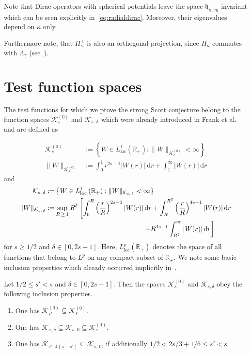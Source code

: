 \documentclass[AHL,Unicode,longabstracts,published]{cedram}
\newcommand{\loc}{\mathrm{loc}}
\newcommand*\dr{\mathrm{d}r}
\newcommand*\rz{\mathbb{R}}
\newcommand*\cK{\mathcal{K}}
\newcommand*\gh{\mathfrak{h}}
\begin{document}
Note that Dirac operators with spherical potentials leave the space $\gh_{\kappa,\,m}$ invariant which can be seen explicitly in~\eqref{eq:radialdirac}. Moreover, their eigenvalues depend on $\kappa$ only.

Furthermore note, that $\Pi^+_\kappa$ is also an orthogonal projection, since $\Pi_\kappa$ commutes with $\Lambda_\gamma$ (see~\cite[Equation~(27)]{HandrekSiedentop2015}).

\section{Test function spaces}\label{s:testfunctions}


The test functions for which we prove the strong Scott conjecture belong to the function spaces $\cK_{s}^{(0)}$ and $\cK_{s,\,\delta}$ which were already introduced in Frank et al. \cite{Franketal2020P} and are defined as

\begin{equation}\label{eq:defsigmadeltanod}
\begin{split}
\cK_{s}^{(0)} & :=\left\{W\in L^1_{\loc}\left(\rz_+\right):\|W\|_{\cK_{s}^{(0)}}<\infty\right\}\\
\|W\|_{\cK_{s}^{(0)}} & := \int_0^1 r^{2s-1}|W(r)|\,\dr + \int_1^\infty |W(r)|\,\dr
\end{split}
\end{equation}
and
\begin{equation}\label{eq:defsigmadelta}
\begin{split}
\cK_{s,\,\delta} :=& \left\{W\in L^1_{\loc}\left(\rz_+\right):\|W\|_{\cK_{s,\,\delta}}<\infty\right\}\\
\|W\|_{\cK_{s,\,\delta}} :=& \sup_{R\,\geq\,1} R^\delta\left[\int_0^R \left(\frac{r}{R}\right)^{2s-1}|W(r)|\,\dr + \int_R^{R^2}\left(\frac{r}{R}\right)^{4s-1} |W(r)|\,\dr\right.\\
&\mkern236mu\left.+ R^{4s-1}\int_{R^2}^\infty |W(r)|\,\dr\right]
\end{split}
\end{equation}
for $s\geq1/2$ and $\delta\in[0,2s-1]$. Here, $L^p_{\loc}(\rz_+)$ denotes the space of all functions that belong to $L^p$ on any compact subset of $\rz_+$. We note some basic inclusion properties which already occurred implicitly in~\cite{Franketal2020P}.
\begin{lemm}\label{inclusions}
Let $1/2\leq s'<s$ and $\delta\in[0,2s-1]$. Then the spaces $\cK_{s}^{(0)}$ and $\cK_{s,\delta}$ obey the following inclusion properties.
\begin{enumerate}
\item One has $\cK_{s'}^{(0)}\subseteq\cK_{s}^{(0)}$.

\item One has $\cK_{s,\,\delta}\subseteq\cK_{s,\,0}\subseteq\cK_{s}^{(0)}$.

\item One has $\cK_{s',\,4(s-s')} \subseteq \cK_{s,\,0}$, if additionally $1/2<2s/3+1/6 \leq s'<s$.
\end{enumerate}
\end{lemm}
\end{document}
